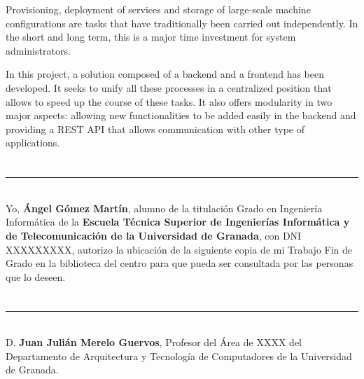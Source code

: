 Provisioning, deployment of services and storage of large-scale machine configurations are tasks that have traditionally been carried out independently. In the short and long term, this is a major time investment for system administrators.

In this project, a solution composed of a backend and a frontend has been developed. It seeks to unify all these processes in a centralized position that allows to speed up the course of these tasks. It also offers modularity in two major aspects: allowing new functionalities to be added easily in the backend and providing a REST API that allows communication with other type of applications.











\chapter*{}
\thispagestyle{empty}

\noindent\rule[-1ex]{\textwidth}{2pt}\\[4.5ex]

Yo, \textbf{Ángel Gómez Martín}, alumno de la titulación Grado en Ingeniería Informática de la \textbf{Escuela Técnica Superior de Ingenierías Informática y de Telecomunicación de la Universidad de Granada}, con DNI XXXXXXXXX, autorizo la ubicación de la siguiente copia de mi Trabajo Fin de Grado en la biblioteca del centro para que pueda ser consultada por las personas que lo deseen.

\vspace{6cm}


\vspace{2cm}












\chapter*{}
\thispagestyle{empty}

\noindent\rule[-1ex]{\textwidth}{2pt}\\[4.5ex]

D. \textbf{Juan Julián Merelo Guervos}, Profesor del Área de XXXX del Departamento de Arquitectura y Tecnología de Computadores de la Universidad de Granada.

